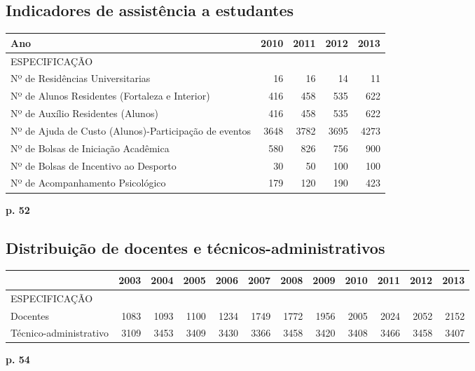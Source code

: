 \documentclass{report}
\begin{document}
\subsection{Indicadores de assistência a estudantes}
\begin{tabular}{lrrrr}
\toprule
Ano &  2010 &  2011 &  2012 &  2013 \\
\midrule
ESPECIFICAÇÃO                                         &       &       &       &       \\
Nº de Residências Universitarias                      &  16 &  16 &  14 &  11 \\
Nº de Alunos Residentes (Fortaleza e Interior)        &  416 &  458 &  535 &  622 \\
Nº de Auxílio Residentes (Alunos)                     &  416 &  458 &  535 &  622 \\
Nº de Ajuda de Custo (Alunos)-Participação de eventos &  3648 &  3782 &  3695 &  4273 \\
Nº de Bolsas de Iniciação Acadêmica                   &  580 &  826 &  756 &  900 \\
Nº de Bolsas de Incentivo ao Desporto                 &  30 &  50 &  100 &  100 \\
Nº de Acompanhamento Psicológico                      &  179 &  120 &  190 &  423 \\
\bottomrule
\end{tabular}

\textbf{p. 52}

\subsection{Distribuição de docentes e técnicos-administrativos}

\begin{tabular}{lrrrrrrrrrrr}
\toprule
{} &  2003 &  2004 &  2005 &  2006 &  2007 &  2008 &  2009 &  2010 &  2011 &  2012 &  2013 \\
\midrule
ESPECIFICAÇÃO          &       &       &       &       &       &       &       &       &       &       &       \\
Docentes               &  1083 &  1093 &  1100 &  1234 &  1749 &  1772 &  1956 &  2005 &  2024 &  2052 &  2152 \\
Técnico-administrativo &  3109 &  3453 &  3409 &  3430 &  3366 &  3458 &  3420 &  3408 &  3466 &  3458 &  3407 \\
\bottomrule
\end{tabular}
\textbf{p. 54}
\end{document}
